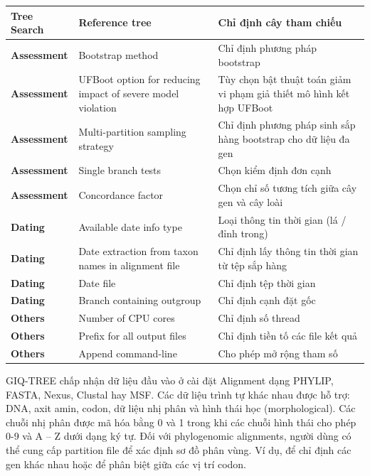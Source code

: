 \documentclass[12pt]{report}
\begin{document}
\begin{longtable}[c]{|p{2.5cm}|p{6.5cm}|p{6.5cm}|}
		\textbf{Tree Search}           & Reference tree    &            Chỉ định cây tham chiếu                     \\ \hline
		\textbf{Assessment}              & Bootstrap method       &        Chỉ định phương pháp bootstrap                         \\ \hline
		\textbf{Assessment}             & UFBoot option for reducing impact of severe model violation    &          Tùy chọn bật thuật toán giảm vi phạm giả thiết mô hình kết hợp UFBoot           \\ \hline
		\textbf{Assessment}           & Multi-partition sampling strategy    &            Chỉ định phương pháp sinh sắp hàng bootstrap cho dữ liệu đa gen                     \\ \hline
		\textbf{Assessment}              & Single branch tests       &        Chọn kiểm định đơn cạnh                       \\ \hline
		\textbf{Assessment}             & Concordance factor    &           Chọn chỉ số tương tích giữa cây gen và cây loài            \\ \hline
		\textbf{Dating}           & Available date info type   &            Loại thông tin thời gian (lá / đỉnh trong)                   \\ \hline
		\textbf{Dating}              & Date extraction from taxon names in alignment file      &        Chỉ định lấy thông tin thời gian từ tệp sắp hàng              \\ \hline
		\textbf{Dating}             & Date file    &          Chỉ định tệp thời gian            \\ \hline
		\textbf{Dating}           & Branch containing outgroup   &           Chỉ định cạnh đặt gốc                     \\ \hline
		\textbf{Others}              & Number of CPU cores     &       Chỉ định số thread             \\ \hline
		\textbf{Others}             & Prefix for all output files    &        Chỉ định tiền tố các file kết quả          \\ \hline
		\textbf{Others}           & Append command-line   &          Cho phép mở rộng tham số                   \\ \hline
\end{longtable}

GIQ-TREE chấp nhận dữ liệu đầu vào ở cài đặt Alignment dạng PHYLIP, FASTA, Nexus, Clustal hay MSF. Các dữ liệu trình tự khác nhau được hỗ trợ: DNA, axit amin, codon, dữ liệu nhị phân và hình thái học (morphological). Các chuỗi nhị phân được mã hóa bằng 0 và 1 trong khi các chuỗi hình thái cho phép 0-9 và A – Z dưới dạng ký tự. Đối với phylogenomic alignments, người dùng có thể cung cấp partition file để xác định sơ đồ phân vùng. Ví dụ, để chỉ định các gen khác nhau hoặc để phân biệt giữa các vị trí codon.
\end{document}
